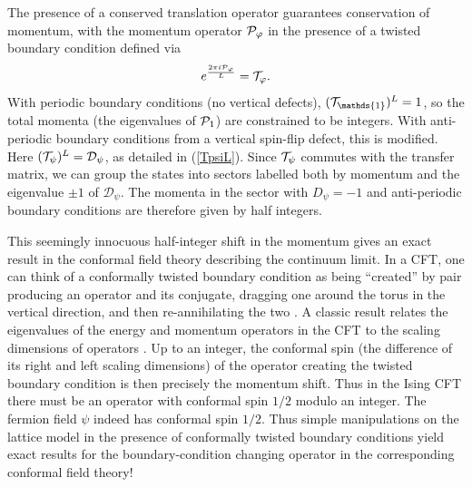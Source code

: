 \documentclass[11pt]{article}
\newcommand{\D}{{\mathcal{D}}}
\newcommand{\T}{{{\cal T}}} %
\numberwithin{equation}{section}		%
\begin{document}
The presence of a conserved translation operator guarantees conservation of momentum, with the momentum operator ${\cal P}_{\varphi}$ in the presence of a twisted boundary condition defined via
 \begin{equation}
e^{\frac{2\pi i {\cal P}_\varphi}{L}} =\T_\varphi .
\label{Pdf}
\end{equation}
With periodic boundary conditions (no vertical defects), $({ \T}_\mathds{1})^L=1$, so the total momenta (the eigenvalues of ${\cal P}_1$) are constrained to be integers. With anti-periodic boundary conditions from a vertical spin-flip defect, this is modified. Here $({\T}_{\psi})^L=\D_\psi$, as detailed in (\ref{TpsiL}). 
Since ${\T}_\psi$ commutes with the transfer matrix, we can group the states into sectors labelled both by momentum and the eigenvalue $\pm 1$ of $\D_\psi$. The momenta in the sector with $D_\psi=-1$ and anti-periodic boundary conditions are therefore given by half integers. 

This seemingly innocuous half-integer shift in the momentum gives an exact result in the conformal field theory describing the continuum limit.  In a CFT, one can think of a conformally twisted boundary condition as being ``created'' by pair producing an operator and its conjugate, dragging one around the torus in the vertical direction, and then re-annihilating the two \cite{Cardy1989}. A classic result relates the eigenvalues of the energy and momentum operators in the CFT to the scaling dimensions of operators \cite{Blote1986,Affleck1986}.
Up to an integer, the conformal spin (the difference of its right and left scaling dimensions) of the operator creating the twisted boundary condition is then precisely the momentum shift. Thus in the Ising CFT there must be an operator with conformal spin $1/2$ modulo an integer. The fermion field $\psi$ indeed has conformal spin $1/2$. Thus simple manipulations on the lattice model in the presence of conformally twisted boundary conditions yield exact results for the boundary-condition changing operator in the corresponding conformal field theory!  

\end{document}
